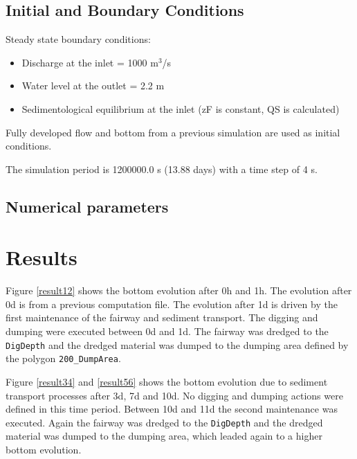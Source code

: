 %
%
\subsection{Initial and Boundary Conditions}
%
Steady state boundary conditions:
\begin{itemize}
\item{Discharge at the inlet = 1000 m$^3$/s}
\item Water level at the outlet = 2.2 m
\item Sedimentological equilibrium at the inlet (zF is constant, QS is calculated)
\end{itemize}
Fully developed flow and bottom from a previous simulation are used as initial conditions.

The simulation period is 1200000.0 s (13.88 days) with a time step of 4 s.
%
%
\subsection{Numerical parameters}
%
%
%
\section{Results}
%
Figure \ref{result12} shows the bottom evolution after 0h and 1h. The evolution after 0d is from a previous computation file. The evolution after 1d is driven by the first maintenance of the fairway and sediment transport. The digging and dumping were executed between 0d and 1d. The fairway was dredged to the \texttt{DigDepth} and the dredged material was dumped to the dumping area defined by the polygon \texttt{200\_DumpArea}.



Figure \ref{result34} and \ref{result56} shows the bottom evolution due to sediment transport processes after 3d, 7d and 10d.
No digging and dumping actions were defined in this time period. Between 10d and 11d the second maintenance was executed. Again the fairway was dredged to the
\texttt{DigDepth} and the dredged material was dumped to the dumping area, which leaded again to a higher bottom evolution.

